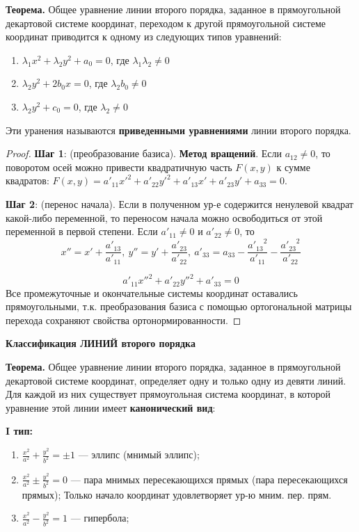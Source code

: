 \textbf{Теорема.} Общее уравнение линии второго порядка, заданное в прямоугольной декартовой системе координат, переходом к другой прямоугольной системе координат приводится к одному из следующих типов уравнений:
\begin{enumerate}
    \item $\lambda_1 x^2 + \lambda_2 y^2 + a_0 = 0$, где $\lambda_1\lambda_2\neq 0$
    \item $\lambda_2 y^2 + 2b_0x = 0$, где $\lambda_2 b_0\neq 0$
    \item $\lambda_2 y^2 + c_0 = 0$, где $\lambda_2\neq 0$
\end{enumerate}
Эти уранения называются \textbf{приведенными уравнениями} линии второго порядка.

\begin{proof}
\textbf{Шаг 1}: (преобразование базиса). \textbf{Метод вращений}. Если $a_{12} \neq 0$, то поворотом осей можно привести квадратичную часть $F(x,y)$ к сумме квадратов: $F(x,y) = a'_{11}x'^{2} + a'_{22}y'^{2} + a'_{13}x' + a'_{23}y' + a_{33} = 0$.

\textbf{Шаг 2}: (перенос начала). Если в полученном ур-е содержится ненулевой квадрат какой-либо переменной, то переносом начала можно освободиться от этой переменной в первой степени. Если $a'_{11} \neq 0$ и $a'_{22} \neq 0$, то 
$$
x'' = x' + \frac{a'_{13}}{a'_{11}}, \ y'' = y' + \frac{a'_{23}}{a'_{22}}, \ a'_{33} = a_{33} - \frac{{a'_{13}}^2}{a'_{11}} - \frac{{a'_{23}}^2}{a'_{22}}
$$

$$
a'_{11}x''^{2} + a'_{22}y''^{2} + a'_{33} = 0
$$
Все промежуточные и окончательные системы координат оставались прямоугольными, т.к. преобразования базиса с помощью ортогональной матрицы перехода сохраняют свойства ортонормированности.
\end{proof}


\textbf{Классификация ЛИНИЙ второго порядка}

\textbf{Теорема.} Общее уравнение линии второго порядка, заданное в прямоугольной декартовой системе координат, определяет одну и только одну из девяти линий. Для каждой из них существует прямоугольная система координат, в которой уравнение этой линии имеет \textbf{канонический вид}:

\textbf{I тип:}
\begin{enumerate}
    \item $\frac{x^2}{a^2} + \frac{y^2}{b^2} = \pm1$ --- эллипс (мнимый эллипс);
    \item $\frac{x^2}{a^2} \pm \frac{y^2}{b^2} = 0$ --- пара мнимых пересекающихся прямых (пара пересекающихся прямых); Только начало координат удовлетворяет ур-ю мним. пер. прям.
    \item $\frac{x^2}{a^2} - \frac{y^2}{b^2} = 1$ --- гипербола;
\end{enumerate}


